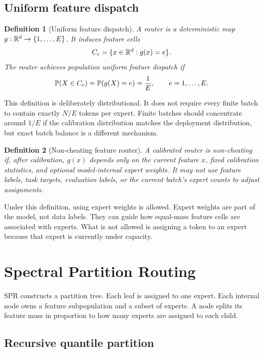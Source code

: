 \documentclass{article}
\newtheorem{definition}{Definition}
\begin{document}
\subsection{Uniform feature dispatch}

\begin{definition}[Uniform feature dispatch]
A router is a deterministic map $g:\mathbb{R}^d\to\{1,\ldots,E\}$.  It induces feature
cells
\begin{equation}
 C_e = \{x\in\mathbb{R}^d: g(x)=e\}.
\end{equation}
The router achieves population uniform feature dispatch if
\begin{equation}
 \mathbb{P}(X\in C_e)=\mathbb{P}(g(X)=e)=\frac{1}{E},\qquad e=1,\ldots,E.
\end{equation}
\end{definition}

This definition is deliberately distributional.  It does not require every
finite batch to contain exactly $N/E$ tokens per expert.  Finite batches should
concentrate around $1/E$ if the calibration distribution matches the deployment
distribution, but exact batch balance is a different mechanism.

\begin{definition}[Non-cheating feature router]
A calibrated router is non-cheating if, after calibration, $g(x)$ depends only on
the current feature $x$, fixed calibration statistics, and optional
model-internal expert weights.  It may not use feature labels, task targets,
evaluation labels, or the current batch's expert counts to adjust assignments.
\end{definition}

Under this definition, using expert weights is allowed.  Expert weights are part
of the model, not data labels.  They can guide how equal-mass feature cells are
associated with experts.  What is not allowed is assigning a token to an expert
because that expert is currently under capacity.

\section{Spectral Partition Routing}

SPR constructs a partition tree.  Each leaf is assigned to one expert.  Each
internal node owns a feature subpopulation and a subset of experts.  A node
splits its feature mass in proportion to how many experts are assigned to each
child.

\subsection{Recursive quantile partition}
\end{document}
